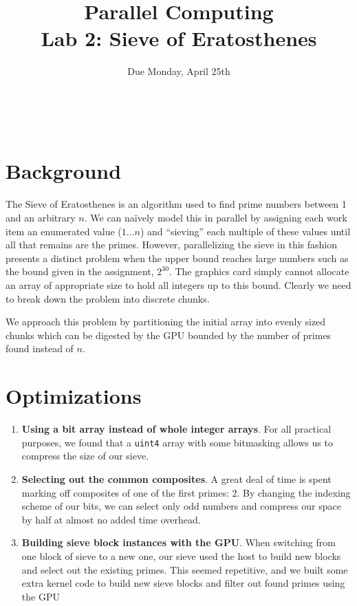\documentclass[12pt]{article}
\title{ Parallel Computing \\ Lab 2: Sieve of Eratosthenes }
\author{\MyFullName}
\date{ Due Monday, April 25th }
\begin{document}
\maketitle
\thispagestyle{empty}
\begin{center}
\end{center}
\setcounter{page}{0}
\newpage

\def\thesection{\Roman{section}.}
\hfill \\
\section{ Background }

\paragraph{}The Sieve of Eratosthenes is an algorithm used to find prime numbers between 1 and an arbitrary $n$. 
We can naïvely model this in parallel by assigning each work item an enumerated value ($1\ldots n$) and ``sieving'' each multiple of these values until all that remains are the primes. 
However, parallelizing the sieve in this fashion presents a distinct problem when the upper bound reaches large numbers such as the bound given in the assignment, $2^{30}$.
The graphics card simply cannot allocate an array of appropriate size to hold all integers up to this bound. 
Clearly we need to break down the problem into discrete chunks.

We approach this problem by partitioning the initial array into evenly sized chunks which can be digested by the GPU bounded by the number of primes found instead of $n$. 

\section{ Optimizations }
\begin{enumerate}[1.]
\item \textbf{Using a bit array instead of whole integer arrays}. For all practical purposes, we found that a \texttt{uint4} array with some bitmasking allows us to compress the size of our sieve.

\item \textbf{Selecting out the common composites}. A great deal of time is spent marking off composites of one of the first primes: $2$. By changing the indexing scheme of our bits, we can select only odd numbers and compress our space by half at almost no added time overhead.

\item \textbf{Building sieve block instances with the GPU}. When switching from one block of sieve to a new one, our sieve used the host to build new blocks and select out the existing primes. This seemed repetitive, and we built some extra kernel code to build new sieve blocks and filter out found primes using the GPU
\end{enumerate}
\end{document}
